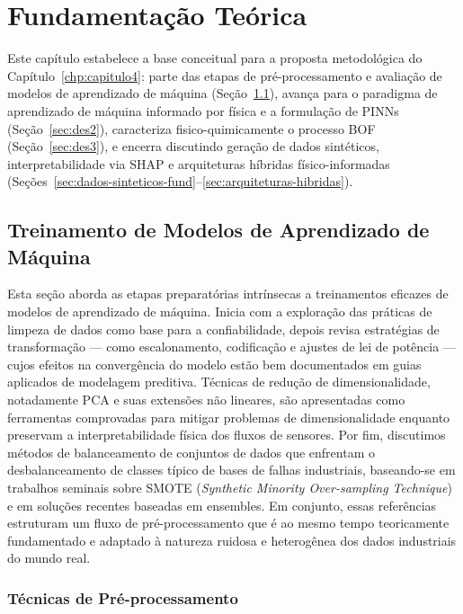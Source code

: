 \chapter{Fundamentação Teórica}
\label{chp:ass}

Este capítulo estabelece a base conceitual para a proposta metodológica do Capítulo~\ref{chp:capitulo4}: parte das etapas de pré-processamento e avaliação de modelos de aprendizado de máquina (Seção~\ref{sec:treinamento-ml}), avança para o paradigma de aprendizado de máquina informado por física e a formulação de PINNs (Seção~\ref{sec:des2}), caracteriza fisico-quimicamente o processo BOF (Seção~\ref{sec:des3}), e encerra discutindo geração de dados sintéticos, interpretabilidade via SHAP e arquiteturas híbridas físico-informadas (Seções~\ref{sec:dados-sinteticos-fund}--\ref{sec:arquiteturas-hibridas}).

\section{Treinamento de Modelos de Aprendizado de Máquina}
\label{sec:treinamento-ml}

Esta seção aborda as etapas preparatórias intrínsecas a treinamentos eficazes
de modelos de aprendizado de máquina. Inicia com a exploração das práticas de
limpeza de dados como base para a confiabilidade\cite{rahm2000data,kuhn2013applied,aggarwal2015outlier},
depois revisa estratégias de transformação — como escalonamento, codificação e
ajustes de lei de potência — cujos efeitos na convergência do modelo estão bem
documentados em guias aplicados de modelagem preditiva\cite{kuhn2013applied}.
Técnicas de redução de dimensionalidade, notadamente PCA e suas extensões não
lineares, são apresentadas como ferramentas comprovadas para mitigar problemas de
dimensionalidade enquanto preservam a interpretabilidade física dos fluxos de
sensores\cite{jolliffe2016pca,vandermaaten2008tsne}. Por fim, discutimos métodos
de balanceamento de conjuntos de dados que enfrentam o desbalanceamento de classes
típico de bases de falhas industriais, baseando-se em trabalhos seminais sobre SMOTE (\textit{Synthetic Minority Over-sampling Technique}) e em soluções recentes baseadas em ensembles\cite{chawla2002smote,he2009imbalanced,galar2012review}.
Em conjunto, essas referências estruturam um fluxo de pré-processamento que é ao
mesmo tempo teoricamente fundamentado e adaptado à natureza ruidosa e heterogênea
dos dados industriais do mundo real.

\subsection{Técnicas de Pré-processamento}
\label{subsec:preprocessamento}

